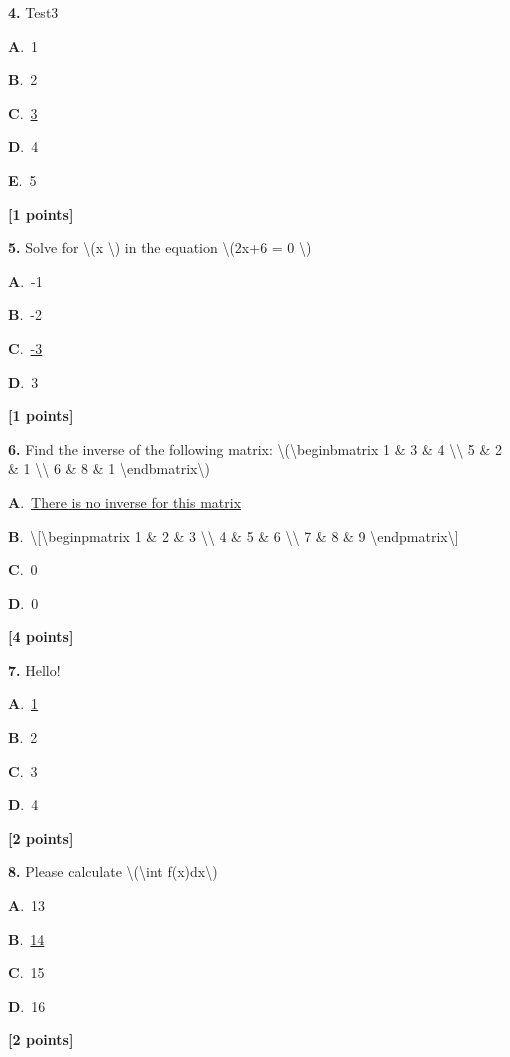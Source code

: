 \documentclass[12pt]{article}
\newcommand{\choice}[3]{%
  \noindent\textbf{#1}.~#2\hfill#3\par\vspace{0.25em}
}
\begin{document}
\noindent \textbf{\textenglish{4.}} {\textenglish{Test3}}

\noindent\choice{A}{{\textenglish{1}}}{}
\noindent\choice{B}{{\textenglish{2}}}{}
\noindent\choice{C}{\underline{{\textenglish{3}}}}{}
\noindent\choice{D}{{\textenglish{4}}}{}
\noindent\choice{E}{{\textenglish{5}}}{}
\hfill \textbf{[1 points]}\vspace{0.5em}

\noindent \textbf{\textenglish{5.}} {\textenglish{Solve for \textbackslash{}(x \textbackslash{}) in the equation \textbackslash{}(2x+6 = 0 \textbackslash{})}}

\noindent\choice{A}{{\textenglish{-1}}}{}
\noindent\choice{B}{{\textenglish{-2}}}{}
\noindent\choice{C}{\underline{{\textenglish{-3}}}}{}
\noindent\choice{D}{{\textenglish{3}}}{}
\hfill \textbf{[1 points]}\vspace{0.5em}

\noindent \textbf{\textenglish{6.}} {\textenglish{Find the inverse of the following matrix: \textbackslash{}(\textbackslash{}begin{bmatrix} 1 \& 3 \& 4 \textbackslash{}\textbackslash{} 5 \& 2 \& 1 \textbackslash{}\textbackslash{} 6 \& 8 \& 1 \textbackslash{}end{bmatrix}\textbackslash{})}}

\noindent\choice{A}{\underline{{\textenglish{There is no inverse for this matrix}}}}{}
\noindent\choice{B}{{\textenglish{\textbackslash{}[\textbackslash{}begin{pmatrix} 1 \& 2 \& 3 \textbackslash{}\textbackslash{} 4 \& 5 \& 6 \textbackslash{}\textbackslash{} 7 \& 8 \& 9  \textbackslash{}end{pmatrix}\textbackslash{}]}}}{}
\noindent\choice{C}{{\textenglish{0}}}{}
\noindent\choice{D}{{\textenglish{0}}}{}
\hfill \textbf{[4 points]}\vspace{0.5em}

\noindent \textbf{\textenglish{7.}} {\textenglish{Hello!}}

\noindent\choice{A}{\underline{{\textenglish{1}}}}{}
\noindent\choice{B}{{\textenglish{2}}}{}
\noindent\choice{C}{{\textenglish{3}}}{}
\noindent\choice{D}{{\textenglish{4}}}{}
\hfill \textbf{[2 points]}\vspace{0.5em}

\noindent \textbf{\textenglish{8.}} {\textenglish{Please calculate \textbackslash{}(\textbackslash{}int f(x)dx\textbackslash{})}}

\noindent\choice{A}{{\textenglish{13}}}{}
\noindent\choice{B}{\underline{{\textenglish{14}}}}{}
\noindent\choice{C}{{\textenglish{15}}}{}
\noindent\choice{D}{{\textenglish{16}}}{}
\hfill \textbf{[2 points]}\vspace{0.5em}
\end{document}
